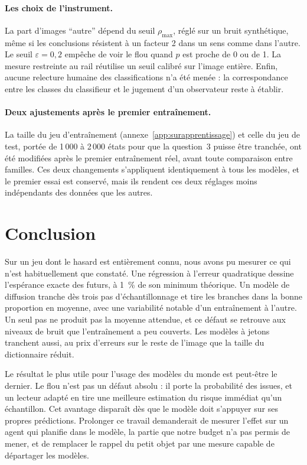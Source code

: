 \documentclass[a4paper, 11pt]{article}
\begin{document}
\paragraph{Les choix de l'instrument.} La part d'images \enquote{autre} dépend du seuil $\rho_{\max}$, réglé sur un bruit
synthétique, même si les conclusions résistent à un facteur 2 dans un sens comme dans l'autre. Le seuil $\varepsilon = 0{,}2$ empêche de voir le flou quand $p$ est proche de 0 ou de 1. La mesure restreinte au rail
réutilise un seuil calibré sur l'image entière. Enfin, aucune relecture humaine des classifications n'a été menée : la
correspondance entre les classes du classifieur et le jugement d'un observateur reste à établir.

\paragraph{Deux ajustements après le premier entraînement.} La taille du jeu d'entraînement (annexe~\ref{app:surapprentissage})
et celle du jeu de test, portée de 1\,000 à 2\,000 états pour que la question~3 puisse être tranchée, ont été modifiées après le
premier entraînement réel, avant toute comparaison entre familles. Ces deux changements s'appliquent identiquement à tous les
modèles, et le premier essai est conservé, mais ils rendent ces deux réglages moins indépendants des données que les autres.

\section{Conclusion}\label{sec:conclusion}

Sur un jeu dont le hasard est entièrement connu, nous avons pu mesurer ce qui n'est habituellement que constaté. Une régression
à l'erreur quadratique dessine l'espérance exacte des futurs, à 1~\% de son minimum théorique. Un modèle de diffusion tranche
dès trois pas d'échantillonnage et tire les branches dans la bonne proportion en moyenne, avec une variabilité notable d'un
entraînement à l'autre. Un seul pas ne produit pas la moyenne attendue, et ce défaut se retrouve aux niveaux de bruit que
l'entraînement a peu couverts. Les modèles à jetons tranchent aussi, au prix d'erreurs sur le reste de l'image que la taille du
dictionnaire réduit.

Le résultat le plus utile pour l'usage des modèles du monde est peut-être le dernier. Le flou n'est pas un défaut absolu : il
porte la probabilité des issues, et un lecteur adapté en tire une meilleure estimation du risque immédiat qu'un échantillon.
Cet avantage disparaît dès que le modèle doit s'appuyer sur ses propres prédictions. Prolonger ce travail demanderait de
mesurer l'effet sur un agent qui planifie dans le modèle, la partie que notre budget n'a pas permis de mener, et de remplacer
le rappel du petit objet par une mesure capable de départager les modèles.
\end{document}
